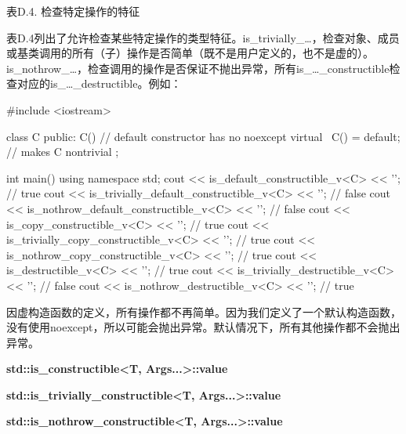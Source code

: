 \begin{center}
表D.4. 检查特定操作的特征
\end{center}

表D.4列出了允许检查某些特定操作的类型特征。is\_trivially\_…，检查对象、成员或基类调用的所有（子）操作是否简单（既不是用户定义的，也不是虚的）。is\_nothrow\_…，检查调用的操作是否保证不抛出异常，所有is\_…\_constructible检查对应的is\_…\_destructible。例如：

\begin{cpp}
#include <iostream>

class C {
	public:
	C() { // default constructor has no noexcept
	}
	virtual ~C() = default; // makes C nontrivial
};

int main()
{
	using namespace std;
	cout << is_default_constructible_v<C> << '\n'; // true
	cout << is_trivially_default_constructible_v<C> << '\n'; // false
	cout << is_nothrow_default_constructible_v<C> << '\n'; // false
	cout << is_copy_constructible_v<C> << '\n'; // true
	cout << is_trivially_copy_constructible_v<C> << '\n'; // true
	cout << is_nothrow_copy_constructible_v<C> << '\n'; // true
	cout << is_destructible_v<C> << '\n'; // true
	cout << is_trivially_destructible_v<C> << '\n'; // false
	cout << is_nothrow_destructible_v<C> << '\n'; // true
}
\end{cpp}

因虚构造函数的定义，所有操作都不再简单。因为我们定义了一个默认构造函数，没有使用noexcept，所以可能会抛出异常。默认情况下，所有其他操作都不会抛出异常。

\textbf{std::is\_constructible<T, Args...>::value}

\textbf{std::is\_trivially\_constructible<T, Args...>::value}

\textbf{std::is\_nothrow\_constructible<T, Args...>::value}

